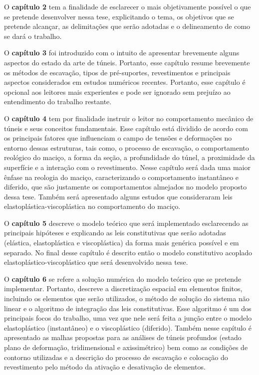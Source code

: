O \textbf{capítulo 2} tem a finalidade de esclarecer o mais objetivamente possível o que se pretende desenvolver nessa tese, explicitando o tema, os objetivos que se pretende alcançar, as delimitações que serão adotadas e o delineamento de como se dará o trabalho.

O \textbf{capítulo 3} foi introduzido com o intuito de apresentar brevemente alguns aspectos do estado da arte de túneis. Portanto, esse capítulo resume brevemente os métodos de escavação, tipos de pré-suportes, revestimentos e principais aspectos considerados em estudos numéricos recentes. Portanto, esse capítulo é opcional aos leitores mais experientes e pode ser ignorado sem prejuízo ao entendimento do trabalho restante.

O \textbf{capítulo 4} tem por finalidade instruir o leitor no comportamento mecânico de túneis e seus conceitos fundamentais. Esse capítulo está dividido de acordo com os principais fatores que influenciam o campo de tensões e deformações no entorno dessas estruturas, tais como, o processo de escavação, o comportamento reológico do maciço, a forma da seção, a profundidade do túnel, a proximidade da superfície e a interação com o revestimento. Nesse capítulo será dada uma maior ênfase na reologia do maciço, caracterizando o comportamento instantâneo e diferido, que são justamente os comportamentos almejados no modelo proposto dessa tese. Também será apresentado alguns estudos que consideraram leis elastoplástica-viscoplástica no comportamento do maciço.

O \textbf{capítulo 5} descreve o modelo teórico que será implementado esclarecendo as principais hipóteses e explicando as leis constitutivas que serão adotadas (elástica, elastoplástica e viscoplástica) da forma mais genérica possível e em separado. No final desse capítulo é descrito então o modelo constitutivo acoplado elastoplástico-viscoplástico que será desenvolvido nessa tese.

O \textbf{capítulo 6} se refere a solução numérica do modelo teórico que se pretende implementar. Portanto, descreve a discretização espacial em elementos finitos, incluindo os elementos que serão utilizados, o método de solução do sistema não linear e o algoritmo de integração das leis constitutivas. Esse algoritmo é um dos principais focos do trabalho, uma vez que nele será feita a junção entre o modelo elastoplástico (instantâneo) e o viscoplástico (diferido). Também nesse capítulo é apresentado as malhas propostas para as análises de túneis profundos (estado plano de deformação, tridimensional e axissimétrico) bem como as condições de contorno utilizadas e a descrição do processo de escavação e colocação do revestimento pelo método da ativação e desativação de elementos.

